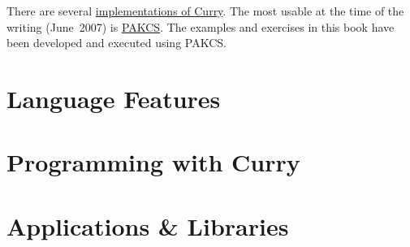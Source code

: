 \documentclass[11pt,fleqn]{report}
\newcommand{\pakcs}%
  {\href{http://www.informatik.uni-kiel.de/~pakcs}{{\sc PAKCS}}}
\begin{document}
There are several 
\href{http://www.informatik.uni-kiel.de/~curry/implementations.html}
{implementations of Curry}.
The most usable at the time of the writing (June~2007) is \pakcs.
The examples and exercises in this book have been developed
and executed using PAKCS.



\part{Language Features}




\part{Programming with Curry}


\part{Applications \& Libraries}



\newpage
{}



\newpage
{}
\printindex
\end{document}
